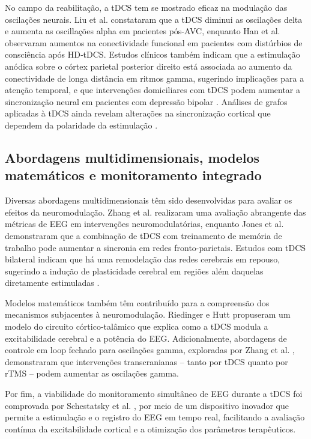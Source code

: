 No campo da reabilitação, a tDCS tem se mostrado eficaz na modulação das oscilações neurais. Liu et al. \cite{liu2023effects} constataram que a tDCS diminui as oscilações delta e aumenta as oscillações alpha em pacientes pós-AVC, enquanto Han et al. \cite{han2022functional} observaram aumentos na conectividade funcional em pacientes com distúrbios de consciência após HD‑tDCS. Estudos clínicos também indicam que a estimulação anódica sobre o córtex parietal posterior direito está associada ao aumento da conectividade de longa distância em ritmos gamma, sugerindo implicações para a atenção temporal, e que intervenções domiciliares com tDCS podem aumentar a sincronização neural em pacientes com depressão bipolar \cite{xiao2025enhanced}. Análises de grafos aplicadas à tDCS ainda revelam alterações na sincronização cortical que dependem da polaridade da estimulação \cite{mancini2016assessing, pellegrino2019transcranial, schollmann2019anodal}.

\subsection{Abordagens multidimensionais, modelos matemáticos e monitoramento integrado}

Diversas abordagens multidimensionais têm sido desenvolvidas para avaliar os efeitos da neuromodulação. Zhang et al. \cite{zhang2022multidimensional} realizaram uma avaliação abrangente das métricas de EEG em intervenções neuromodulatórias, enquanto Jones et al. \cite{jones2017frontoparietal} demonstraram que a combinação de tDCS com treinamento de memória de trabalho pode aumentar a sincronia em redes fronto-parietais. Estudos com tDCS bilateral indicam que há uma remodelação das redes cerebrais em repouso, sugerindo a indução de plasticidade cerebral em regiões além daquelas diretamente estimuladas \cite{pellegrino2018bilateral}.

Modelos matemáticos também têm contribuído para a compreensão dos mecanismos subjacentes à neuromodulação. Riedinger e Hutt \cite{riedinger2022model} propuseram um modelo do circuito córtico-talâmico que explica como a tDCS modula a excitabilidade cerebral e a potência do EEG. Adicionalmente, abordagens de controle em loop fechado para oscilações gamma, exploradas por Zhang et al. \cite{zhang2024closed}, demonstraram que intervenções transcranianas – tanto por tDCS quanto por rTMS – podem aumentar as oscilações gamma. 

Por fim, a viabilidade do monitoramento simultâneo de EEG durante a tDCS foi comprovada por Schestatsky et al. \cite{schesatsky2013simultaneous}, por meio de um dispositivo inovador que permite a estimulação e o registro do EEG em tempo real, facilitando a avaliação contínua da excitabilidade cortical e a otimização dos parâmetros terapêuticos.

